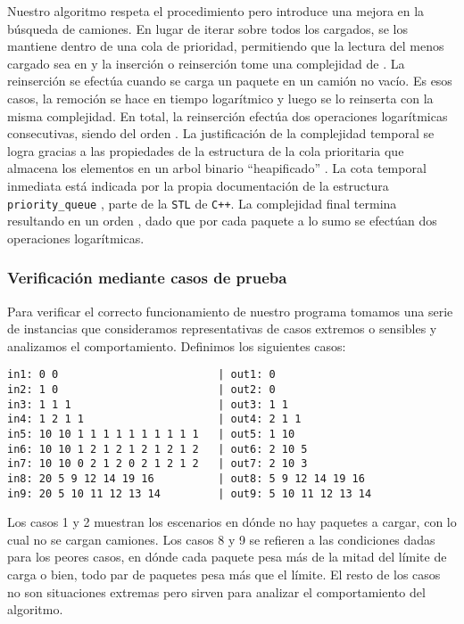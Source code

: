 \documentclass[11pt, a4paper, twoside]{article}
\begin{document}
Nuestro algoritmo respeta el procedimiento pero introduce una mejora en la búsqueda de
camiones. En lugar de iterar sobre todos los cargados, se los mantiene dentro de una
cola de prioridad, permitiendo que la lectura del menos cargado sea en 
y la inserción o reinserción tome una complejidad de . 
La reinserción se efectúa cuando se carga un paquete en un camión no vacío.
Es esos casos, la remoción se hace en tiempo logarítmico y luego se lo reinserta
con la misma complejidad. En total, la reinserción efectúa dos operaciones logarítmicas consecutivas,
siendo del orden . La justificación de la complejidad temporal se logra
gracias a las propiedades de la estructura de la cola prioritaria
que almacena los elementos en un arbol binario \enquote{heapificado} .
La cota temporal inmediata está indicada por la propia documentación de la 
estructura \texttt{priority\_queue} , parte de la \texttt{STL} 
de \texttt{C++}. La complejidad final termina resultando en un orden ,
dado que por cada paquete a lo sumo se efectúan dos operaciones logarítmicas.

\subsubsection{Verificación mediante casos de prueba}

Para verificar el correcto funcionamiento de nuestro programa tomamos
una serie de instancias que consideramos representativas de casos extremos
o sensibles y analizamos el comportamiento. Definimos los siguientes casos:

\begin{verbatim}
in1: 0 0                         | out1: 0
in2: 1 0                         | out2: 0
in3: 1 1 1                       | out3: 1 1
in4: 1 2 1 1                     | out4: 2 1 1
in5: 10 10 1 1 1 1 1 1 1 1 1 1   | out5: 1 10
in6: 10 10 1 2 1 2 1 2 1 2 1 2   | out6: 2 10 5
in7: 10 10 0 2 1 2 0 2 1 2 1 2   | out7: 2 10 3
in8: 20 5 9 12 14 19 16          | out8: 5 9 12 14 19 16
in9: 20 5 10 11 12 13 14         | out9: 5 10 11 12 13 14
\end{verbatim}

Los casos 1 y 2 muestran los escenarios en dónde no hay paquetes a cargar, con
lo cual no se cargan camiones. Los casos 8 y 9 se refieren a las condiciones
dadas para los peores casos, en dónde cada paquete pesa más de la mitad
del límite de carga o bien, todo par de paquetes pesa más que el límite.
El resto de los casos no son situaciones extremas pero sirven para analizar
el comportamiento del algoritmo.
\end{document}
